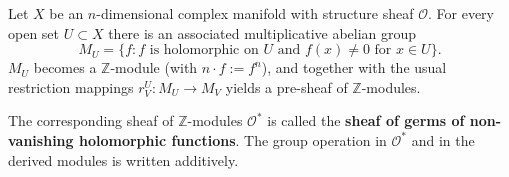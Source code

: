 Let $X$ be an $n$-dimensional complex manifold with structure sheaf $\mathcal{O}$.
For every open set $U \subset X$ there is an associated multiplicative abelian group
$$M_U = \{f : f \text{ is holomorphic on } U \text{ and } f(x) \neq 0 \text{ for } x \in U\}.$$
$M_U$ becomes a $\mathbb{Z}$-module (with $n \cdot f := f^n$), and together with the
usual restriction mappings $r_V^U: M_U \rightarrow M_V$ yields a pre-sheaf of
$\mathbb{Z}$-modules.

The corresponding sheaf of $\mathbb{Z}$-modules $\mathcal{O}^*$ is called the
\textbf{sheaf of germs of non-vanishing holomorphic functions}.
The group operation in $\mathcal{O}^*$ and in the derived modules is written additively.
